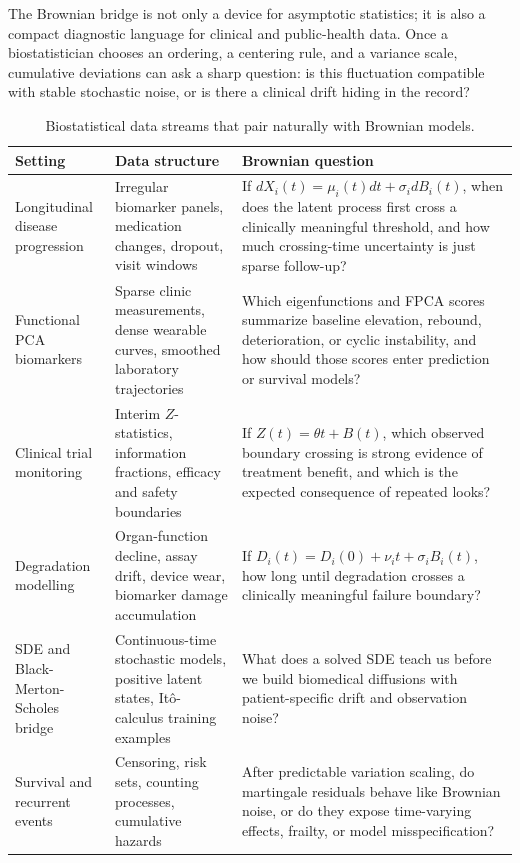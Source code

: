 \documentclass{article}
\theoremstyle{plain}
\theoremstyle{definition}
\begin{document}
The Brownian bridge is not only a device for asymptotic statistics; it is also a compact diagnostic language for clinical and public-health data. Once a biostatistician chooses an ordering, a centering rule, and a variance scale, cumulative deviations can ask a sharp question: is this fluctuation compatible with stable stochastic noise, or is there a clinical drift hiding in the record?

\begin{table}[H]
\centering
\small
\caption{Biostatistical data streams that pair naturally with Brownian models.}
\label{tab:clinical-vignettes}
\begin{tabularx}{\textwidth}{>{\RaggedRight\arraybackslash}p{}>{\RaggedRight\arraybackslash}p{}>{\RaggedRight\arraybackslash}X}
\toprule
Setting & Data structure & Brownian question \\
\midrule
Longitudinal disease progression &
Irregular biomarker panels, medication changes, dropout, visit windows &
If \(dX_i(t)=\mu_i(t)dt+\sigma_i dB_i(t)\), when does the latent process first cross a clinically meaningful threshold, and how much crossing-time uncertainty is just sparse follow-up? \\
Functional PCA biomarkers &
Sparse clinic measurements, dense wearable curves, smoothed laboratory trajectories &
Which eigenfunctions and FPCA scores summarize baseline elevation, rebound, deterioration, or cyclic instability, and how should those scores enter prediction or survival models? \\
Clinical trial monitoring &
Interim \(Z\)-statistics, information fractions, efficacy and safety boundaries &
If \(Z(t)=\theta t+B(t)\), which observed boundary crossing is strong evidence of treatment benefit, and which is the expected consequence of repeated looks? \\
Degradation modelling &
Organ-function decline, assay drift, device wear, biomarker damage accumulation &
If \(D_i(t)=D_i(0)+\nu_i t+\sigma_iB_i(t)\), how long until degradation crosses a clinically meaningful failure boundary? \\
SDE and Black-Merton-Scholes bridge &
Continuous-time stochastic models, positive latent states, Itô-calculus training examples &
What does a solved SDE teach us before we build biomedical diffusions with patient-specific drift and observation noise? \\
Survival and recurrent events &
Censoring, risk sets, counting processes, cumulative hazards &
After predictable variation scaling, do martingale residuals behave like Brownian noise, or do they expose time-varying effects, frailty, or model misspecification? \\

\end{tabularx}
\end{table}
\end{document}
